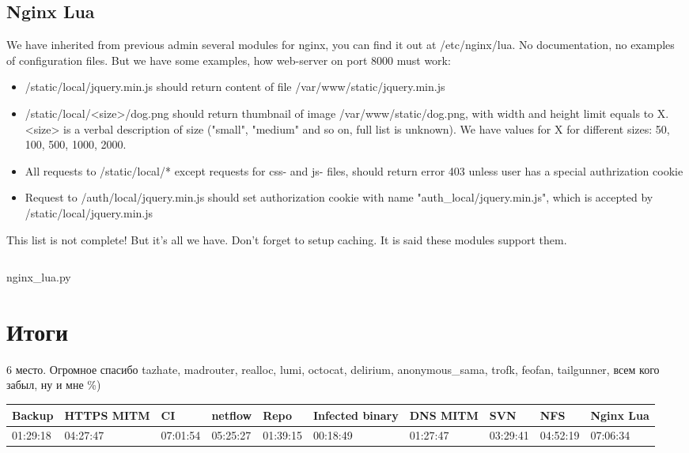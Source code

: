 \documentclass[a4paper,10pt]{report}
\begin{document}
\chapter{Nginx Lua}
We have inherited from previous admin several modules for nginx, you can find it out at /etc/nginx/lua.
\newline
No documentation, no examples of configuration files. But we have some examples, how web-server on port 8000 must work:
\begin{itemize}
  \item /static/local/jquery.min.js should return content of file /var/www/static/jquery.min.js
  \item /static/local/<size>/dog.png should return thumbnail of image /var/www/static/dog.png, with width and height limit equals to X. <size> is a verbal description of size ("small", "medium" and so on, full list is unknown). We have values for X for different sizes: 50, 100, 500, 1000, 2000.
  \item All requests to /static/local/* except requests for css- and js- files, should return error 403 unless user has a special authrization cookie
  \item Request to /auth/local/jquery.min.js should set authorization cookie with name "auth\_local/jquery.min.js", which is accepted by /static/local/jquery.min.js
\end{itemize}
This list is not complete! But it's all we have.
\newline  
Don't forget to setup caching. It is said these modules support them.
\newline\newline
\begin{listing}[H]
  \inputminted[linenos=true, fontsize=\scriptsize, samepage=true]{python}{nginx_lua.py}
  \caption{nginx\_lua.py}
  \label{lst:nginx_lua.py}
\end{listing}

\part{Итоги}
6 место. Огромное спасибо tazhate, madrouter, realloc, lumi, octocat, delirium, anonymous\_sama, trofk, feofan, tailgunner, всем кого забыл, ну и мне \%)
\newline\newline
\small 
\begin{tabular}{ | l | l | l | l | l | l | l | l | l | l | }
  \hline
  Backup & HTTPS MITM & CI & netflow & Repo & Infected binary & DNS MITM & SVN & NFS & Nginx Lua\\ \hline
  01:29:18 & 04:27:47 & 07:01:54 & 05:25:27 & 01:39:15 & 00:18:49 & 01:27:47 & 03:29:41 & 04:52:19 & 07:06:34\\
  \hline
\end{tabular}
\end{document}
